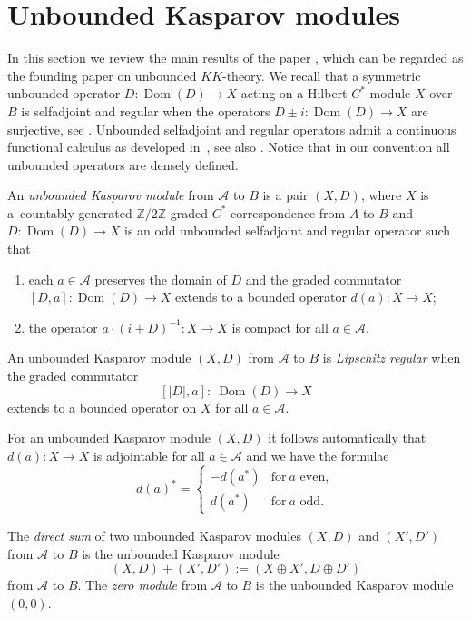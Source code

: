 \documentclass[pdftex]{sigma}
\numberwithin{equation}{section}
\newcommand{\cd}{\cdot}
\newcommand{\op}{\oplus}
\newcommand{\zz}{\mathbb{Z}}
\newcommand{\s}[1]{\mathscr{#1}}
\begin{document}
\section{Unbounded Kasparov modules}
In this section we review the main results of the paper \cite{BaJu:TBK}, which can be regarded as the founding paper on unbounded $KK$-theory. We recall that a symmetric unbounded operator $D\colon \operatorname{Dom}(D) \to X$ acting on a Hilbert $C^*$-module $X$ over $B$ is selfadjoint and regular when the operators $D \pm i\colon \operatorname{Dom}(D) \to X$ are surjective, see \cite[Lemmas~9.7 and~9.8]{Lan:HCM}. Unbounded selfadjoint and regular operators admit a continuous functional calculus as developed in~\cite{Wor:UAQ,WoNa:OTC}, see also \cite[Theorem~10.9]{Lan:HCM}. Notice that in our convention all unbounded operators are densely defined.

\begin{dfn}\label{d:unbkas}
An \emph{unbounded Kasparov module} from $\s A$ to $B$ is a pair $(X,D)$, where $X$ is a~countably generated $\zz/2\zz$-graded $C^*$-correspondence from $A$ to $B$ and $D \colon \operatorname{Dom}(D) \to X$ is an odd unbounded selfadjoint and regular operator such that
\begin{enumerate}\itemsep=0pt
\item[1)] each $a \in \s A$ preserves the domain of $D$ and the graded commutator $[D,a]\colon \operatorname{Dom}(D) \to X$ extends to a bounded operator $d(a)\colon X \to X$;
\item[2)] the operator $a \cd (i + D)^{-1}\colon X \to X$ is compact for all $a \in \s A$.
\end{enumerate}

An unbounded Kasparov module $(X,D)$ from $\s A$ to $B$ is \emph{Lipschitz regular} when the graded commutator
\[
[|D|,a] \colon \ \operatorname{Dom}(D) \to X
\]
extends to a bounded operator on $X$ for all $a \in \s A$.
\end{dfn}

For an unbounded Kasparov module $(X,D)$ it follows automatically that $d(a)\colon X \to X$ is adjointable for all $a \in \s A$ and we have the formulae
\[
d(a)^* = \begin{cases} - d(a^*) & \text{for} \ a \text{ even}, \\ d(a^*) & \text{for} \ a \text{ odd}.\end{cases}
\]

\begin{dfn}\label{d:dirsum}
The \emph{direct sum} of two unbounded Kasparov modules $(X,D)$ and $(X', D')$ from $\s A$ to $B$ is the unbounded Kasparov module
\[
(X, D) + (X', D') := (X \op X', D \op D')
\]
from $\s A$ to $B$. The \emph{zero module} from $\s A$ to $B$ is the unbounded Kasparov module $(0,0)$.
\end{dfn}
\end{document}
